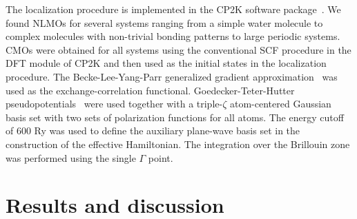 \documentclass[aps,prl,reprint,amsmath,amssymb]{revtex4-1}
\begin{document}
The localization procedure is implemented in the CP2K software package~\cite{cp2kgeneral}. 
We found NLMOs for several systems ranging from a simple water molecule to complex molecules with non-trivial bonding patterns to large periodic systems. 
CMOs were obtained for all systems using the conventional SCF procedure in the DFT module of CP2K and then used as the initial states in the localization procedure. 
The Becke-Lee-Yang-Parr generalized gradient approximation~\cite{becke1988density, lee1988development} was used as the exchange-correlation functional.
Goedecker-Teter-Hutter pseudopotentials~\cite{goedecker1996separable} were used together with a triple-$\zeta$ atom-centered Gaussian basis set with two sets of polarization functions for all atoms. 
The energy cutoff of 600 Ry 
was used to define the auxiliary plane-wave basis set in the construction of the effective Hamiltonian. 
The integration over the Brillouin zone was performed using the single $\Gamma$ point.


\section{Results and discussion}



\end{document}
